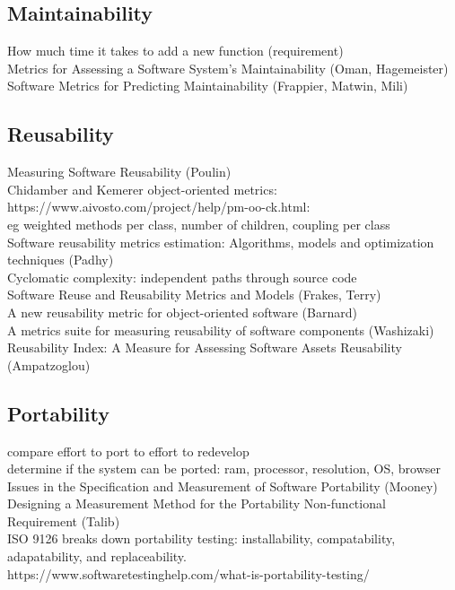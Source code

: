 \documentclass{article}
\begin{document}
\subsection{Maintainability}
How much time it takes to add a new function (requirement)\\ 

Metrics for Assessing a Software System's Maintainability (Oman, Hagemeister)\\ 

Software Metrics for Predicting Maintainability (Frappier, Matwin, Mili) 

\subsection{Reusability}
Measuring Software Reusability (Poulin)\\  

Chidamber and Kemerer object-oriented metrics:\\ 

https://www.aivosto.com/project/help/pm-oo-ck.html:\\ 

eg weighted methods per class, number of children, coupling per class\\ 

Software reusability metrics estimation: Algorithms, models and optimization techniques (Padhy)\\ 

Cyclomatic complexity: independent paths through source code\\ 

Software Reuse and Reusability Metrics and Models (Frakes, Terry)\\ 

A new reusability metric for object-oriented software (Barnard)\\ 

A metrics suite for measuring reusability of software components (Washizaki)\\ 

Reusability Index: A Measure for Assessing Software Assets Reusability (Ampatzoglou) 
\subsection{Portability}
compare effort to port to effort to redevelop\\ 

determine if the system can be ported: ram, processor, resolution, OS, browser\\ 

Issues in the Specification and Measurement of Software Portability (Mooney)\\ 

Designing a Measurement Method for the Portability Non-functional Requirement (Talib)\\ 

ISO 9126 breaks down portability testing: installability, compatability, adapatability, and replaceability.\\ 

https://www.softwaretestinghelp.com/what-is-portability-testing/ 
\end{document}
